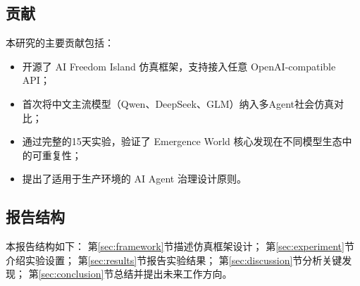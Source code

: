 \subsection{贡献}

本研究的主要贡献包括：

\begin{itemize}
  \item 开源了 AI Freedom Island 仿真框架，支持接入任意 OpenAI-compatible API；
  \item 首次将中文主流模型（Qwen、DeepSeek、GLM）纳入多Agent社会仿真对比；
  \item 通过完整的15天实验，验证了 Emergence World 核心发现在不同模型生态中的可重复性；
  \item 提出了适用于生产环境的 AI Agent 治理设计原则。
\end{itemize}

\subsection{报告结构}

本报告结构如下：
第\ref{sec:framework}节描述仿真框架设计；
第\ref{sec:experiment}节介绍实验设置；
第\ref{sec:results}节报告实验结果；
第\ref{sec:discussion}节分析关键发现；
第\ref{sec:conclusion}节总结并提出未来工作方向。
